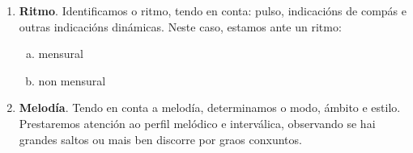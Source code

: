 \begin{multicols}{2}
%
%
%
%
%
%
%
    \begin{enumerate}[1.-]
        \item %
        \textbf{Ritmo}. Identificamos o ritmo, tendo en conta: pulso, indicacións de compás e outras indicacións dinámicas. 
        Neste caso, estamos ante un ritmo:
        \begin{enumerate}[a)]
            \item mensural 
            \item non mensural 
        \end{enumerate}
        \item %
        \textbf{Melodía}. Tendo en conta a melodía, determinamos o modo, ámbito e estilo. Prestaremos atención ao perfil melódico e interválica, observando se hai grandes saltos ou mais ben discorre por graos conxuntos.
        \begin{enumerate}[a)]

\end{enumerate}
\end{enumerate}
\end{multicols}
